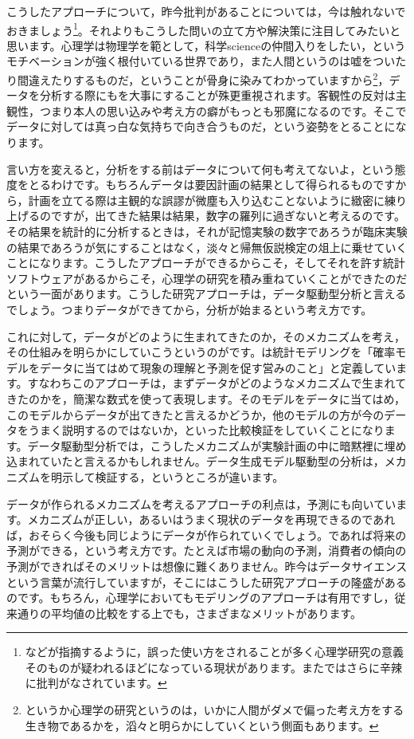\documentclass{ltjsbook}
\begin{document}
こうしたアプローチについて，昨今批判があることについては，今は触れないでおきましょう\footnote{\textcite{amrhein2019scientists}などが指摘するように，誤った使い方をされることが多く心理学研究の意義そのものが疑われるほどになっている現状があります。また\textcite{Toyoda202003}ではさらに辛辣に批判がなされています。}。それよりもこうした問いの立て方や解決策に注目してみたいと思います。心理学は物理学を範として，科学scienceの仲間入りをしたい，というモチベーションが強く根付いている世界であり，また人間というのは嘘をついたり間違えたりするものだ，ということが骨身に染みてわかっていますから\footnote{というか心理学の研究というのは，いかに人間がダメで偏った考え方をする生き物であるかを，滔々と明らかにしていくという側面もあります。}，データを分析する際にもを大事にすることが殊更重視されます。客観性の反対は主観性，つまり本人の思い込みや考え方の癖がもっとも邪魔になるのです。そこでデータに対しては真っ白な気持ちで向き合うものだ，という姿勢をとることになります。

言い方を変えると，分析をする前はデータについて何も考えてないよ，という態度をとるわけです。もちろんデータは要因計画の結果として得られるものですから，計画を立てる際は主観的な誤謬が微塵も入り込むことないように緻密に練り上げるのですが，出てきた結果は結果，数字の羅列に過ぎないと考えるのです。その結果を統計的に分析するときは，それが記憶実験の数字であろうが臨床実験の結果であろうが気にすることはなく，淡々と帰無仮説検定の俎上に乗せていくことになります。こうしたアプローチができるからこそ，そしてそれを許す統計ソフトウェアがあるからこそ，心理学の研究を積み重ねていくことができたのだという一面があります。こうした研究アプローチは，データ駆動型分析と言えるでしょう。つまりデータができてから，分析が始まるという考え方です。

これに対して，データがどのように生まれてきたのか，そのメカニズムを考え，その仕組みを明らかにしていこうというのがです。\textcite{Matsuura201610}は統計モデリングを「確率モデルをデータに当てはめて現象の理解と予測を促す営みのこと」と定義しています。すなわちこのアプローチは，まずデータがどのようなメカニズムで生まれてきたのかを，簡潔な数式を使って表現します。そのモデルをデータに当てはめ，このモデルからデータが出てきたと言えるかどうか，他のモデルの方が今のデータをうまく説明するのではないか，といった比較検証をしていくことになります。データ駆動型分析では，こうしたメカニズムが実験計画の中に暗黙裡に埋め込まれていたと言えるかもしれません。データ生成モデル駆動型の分析は，メカニズムを明示して検証する，というところが違います。

データが作られるメカニズムを考えるアプローチの利点は，予測にも向いています。メカニズムが正しい，あるいはうまく現状のデータを再現できるのであれば，おそらく今後も同じようにデータが作られていくでしょう。であれば将来の予測ができる，という考え方です。たとえば市場の動向の予測，消費者の傾向の予測ができればそのメリットは想像に難くありません。昨今はデータサイエンスという言葉が流行していますが，そこにはこうした研究アプローチの隆盛があるのです。もちろん，心理学においてもモデリングのアプローチは有用ですし，従来通りの平均値の比較をする上でも，さまざまなメリットがあります。
\end{document}
